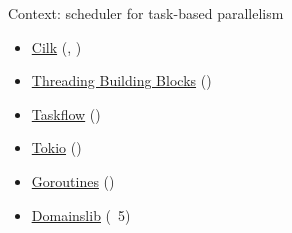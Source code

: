 \begin{frame}[fragile]{Context: scheduler for task-based parallelism}
\begin{itemize}
	\item \href{https://www.opencilk.org/}{Cilk} (\C, \Cpp)
	\item \href{https://github.com/oneapi-src/oneTBB}{Threading Building Blocks} (\Cpp)
	\item \href{https://github.com/taskflow/taskflow}{Taskflow} (\Cpp)
	\item \href{https://docs.rs/tokio/latest/tokio/}{Tokio} (\Rust)
	\item \href{https://go.dev/doc/effective_go#goroutines}{Goroutines} (\Go)
	\item \href{https://github.com/ocaml-multicore/domainslib}{\underline{Domainslib}} (\OCaml~5)
\end{itemize}
\end{frame}
